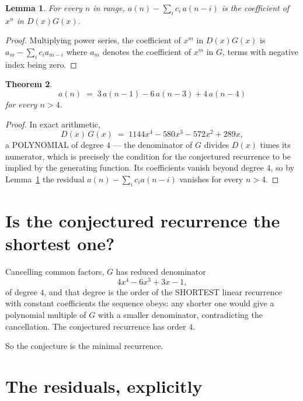 \documentclass[11pt,a4paper]{article}
\theoremstyle{plain}
\newtheorem{theorem}{Theorem}
\newtheorem{lemma}[theorem]{Lemma}
\theoremstyle{definition}
\begin{document}
\begin{lemma}\label{lem:key}
For every $n$ in range, $a(n)-\sum_i c_i\,a(n-i)$ is the coefficient of $x^{n}$ in
$D(x)G(x)$.
\end{lemma}

\begin{proof}
Multiplying power series, the coefficient of $x^{m}$ in $D(x)G(x)$ is
$a_m-\sum_i c_i a_{m-i}$ where $a_m$ denotes the coefficient of $x^{m}$ in $G$, terms with
negative index being zero.
\end{proof}

\begin{theorem}
\[
a(n)\;=\;3\,a(n-1) - 6\,a(n-3) + 4\,a(n-4)
\]
for every $n>4$.
\end{theorem}

\begin{proof}
In exact arithmetic,
\[
D(x)\,G(x)\;=\;1144 x^{4} - 580 x^{3} - 572 x^{2} + 289 x,
\]
a POLYNOMIAL of degree $4$ --- the denominator of $G$ divides $D(x)$ times its numerator,
which is precisely the condition for the conjectured recurrence to be implied by the
generating function. Its coefficients vanish beyond degree $4$, so by
Lemma~\ref{lem:key} the residual $a(n)-\sum_ic_ia(n-i)$ vanishes for every
$n>4$.
\end{proof}

\section{Is the conjectured recurrence the shortest one?}

Cancelling common factors, $G$ has reduced denominator
\[
4 x^{4} - 6 x^{3} + 3 x - 1,
\]
of degree $4$, and that degree is the order of the SHORTEST linear recurrence with
constant coefficients the sequence obeys: any shorter one would give a polynomial multiple of
$G$ with a smaller denominator, contradicting the cancellation. The conjectured recurrence has
order $4$.

So the conjecture is the minimal recurrence.

\section{The residuals, explicitly}
\end{document}
